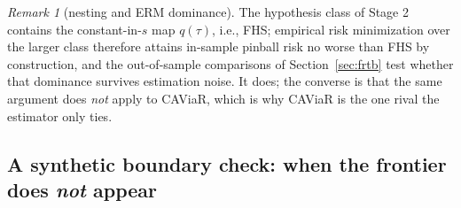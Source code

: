 \documentclass[11pt]{article}
\theoremstyle{remark}
\newtheorem{remark}{Remark}
\begin{document}
\begin{remark}[nesting and ERM dominance]\label{rem:nesting}
The hypothesis class of Stage 2 contains the constant-in-$s$ map
$q(\tau)$, i.e., FHS; empirical risk minimization over the larger class
therefore attains in-sample pinball risk no worse than FHS by
construction, and the out-of-sample comparisons of
Section~\ref{sec:frtb} test whether that dominance survives estimation
noise. It does; the converse is that the same argument does
\emph{not} apply to CAViaR, which is why CAViaR is the one rival the
estimator only ties.
\end{remark}

\subsection{A synthetic boundary check: when the frontier does
\emph{not} appear}\label{sec:toy}
\end{document}
